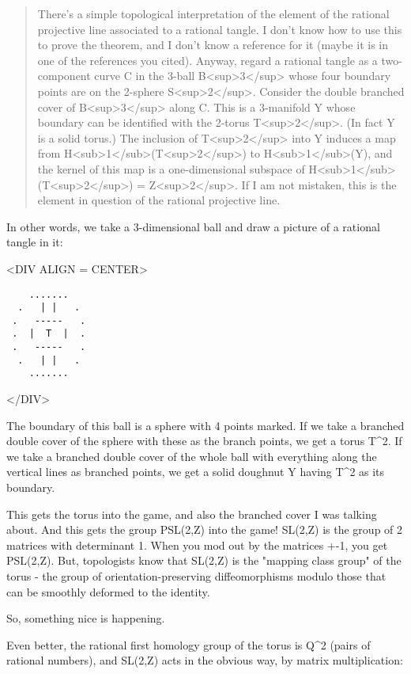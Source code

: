 \begin{quote}
 There's a simple topological interpretation of the element of the
 rational projective line associated to a rational tangle.  I don't know
 how to use this to prove the theorem, and I don't know a reference for
 it (maybe it is in one of the references you cited).  Anyway, regard a
 rational tangle as a two-component curve C in the 3-ball B<sup>3</sup> 
  whose four
 boundary points are on the 2-sphere S<sup>2</sup>.  
 Consider the double branched
 cover of B<sup>3</sup> along C.  This is a 3-manifold Y whose boundary can be
 identified with the 2-torus T<sup>2</sup>.  (In fact Y is a solid torus.)  The
 inclusion of T<sup>2</sup> into Y induces a map from 
 H<sub>1</sub>(T<sup>2</sup>) to H<sub>1</sub>(Y), and the
 kernel of this map is a one-dimensional subspace of H<sub>1</sub>(T<sup>2</sup>) = Z<sup>2</sup>.  If
 I am not mistaken, this is the element in question of the rational
 projective line. 
\end{quote}
    

In other words, we take a 3-dimensional ball and draw a picture
of a rational tangle in it:

<DIV ALIGN = CENTER>
\begin{verbatim}
    .......   
  .   | |   . 
 .   -----   .
 .  |  T  |  .
 .   -----   .
  .   | |   . 
    .......   
\end{verbatim}
    
</DIV>

The boundary of this ball is a sphere with 4 points marked.  If we 
take a branched double cover of the sphere with these as the branch
points, we get a torus T^{2}.   If we take a branched double cover of 
the whole ball with everything along the vertical lines as branched 
points, we get a solid doughnut Y having T^{2} as its boundary.  

This gets the torus into the game, and also the branched cover I was 
talking about.  And this gets the group PSL(2,Z) into the game!  
SL(2,Z) is the group of 2 matrices with determinant 1.  When you 
mod out by the matrices +-1, you get PSL(2,Z).  But, topologists know 
that SL(2,Z) is the "mapping class group" of the torus - the 
group of 
orientation-preserving diffeomorphisms modulo those that can be 
smoothly deformed to the identity.

So, something nice is happening.  

Even better, the rational first homology group of the torus is Q^{2}
(pairs of rational numbers), and SL(2,Z) acts in the obvious way, 
by matrix multiplication:
  
